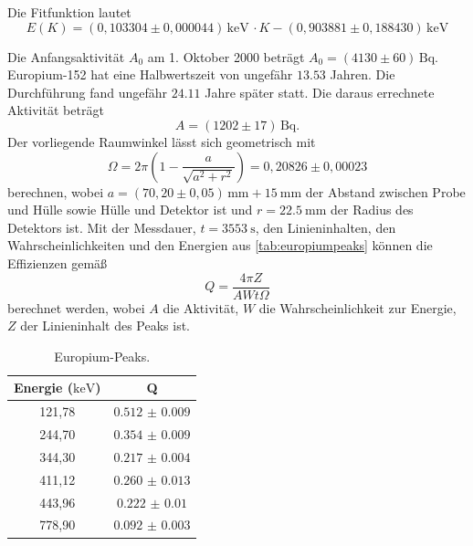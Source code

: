 Die Fitfunktion lautet
\begin{equation}
    E(K) = (0,103304 \pm 0,000044) \, \si{\kilo\electronvolt} \, \cdot K - (0,903881 \pm 0,188430) \, \si{\kilo\electronvolt}
    \label{eq:kanalenergie}
\end{equation}

Die Anfangsaktivität $A_0$ am 1. Oktober 2000 beträgt $A_0 = (4130 \pm 60) \, \si{\becquerel}$. Europium-152 hat eine Halbwertszeit von ungefähr $\num{13,53}$ Jahren.
Die Durchführung fand ungefähr $\num{24,11}$ Jahre später statt.
Die daraus errechnete Aktivität beträgt
\begin{equation}
    A = (1202 \pm 17) \, \si{\becquerel}.
    \label{eq:aktivitätEu}
\end{equation}
Der vorliegende Raumwinkel lässt sich geometrisch mit
\begin{equation}
    \Omega = 2 \pi \left(1 - \frac{a}{\sqrt{a^2 + r^2}}\right) = 0,20826 \pm 0,00023
\end{equation}
berechnen, wobei $a = (70,20 \pm 0,05) \, \si{\milli\meter} + \SI{15}{\milli\meter}$ der Abstand zwischen Probe und Hülle sowie Hülle und Detektor ist und $r = \SI{22,5}{\milli\meter}$ der Radius des Detektors ist.
Mit der Messdauer, $t = \SI{3553}{\second}$, den Linieninhalten, den Wahrscheinlichkeiten und den Energien aus \autoref{tab:europiumpeaks} können
die Effizienzen gemäß
\begin{equation}
    Q = \frac{4 \pi Z}{A W t \Omega}
    \label{eq:effizienz}
\end{equation}
berechnet werden, wobei $A$ die Aktivität, $W$ die Wahrscheinlichkeit zur Energie, $Z$ der Linieninhalt des Peaks ist.

\begin{table}[H]
    \centering
    \caption{Europium-Peaks.}
    \label{tab:europiumeffizienz}
    \begin{tabular}{c c}
        \toprule
        {Energie ($\si{\kilo\electronvolt}$)} & {Q} \\
        \midrule
        121,78 & $\num{0.512(9)}$ \\
        244,70 & $\num{0.354(9)}$ \\
        344,30 & $\num{0.217(4)}$ \\
        411,12 & $\num{0.260(13)}$ \\
        443,96 & $\num{0.222(10)}$ \\
        778,90 & $\num{0.092(3)}$ \\
        \bottomrule
    \end{tabular}
\end{table}

